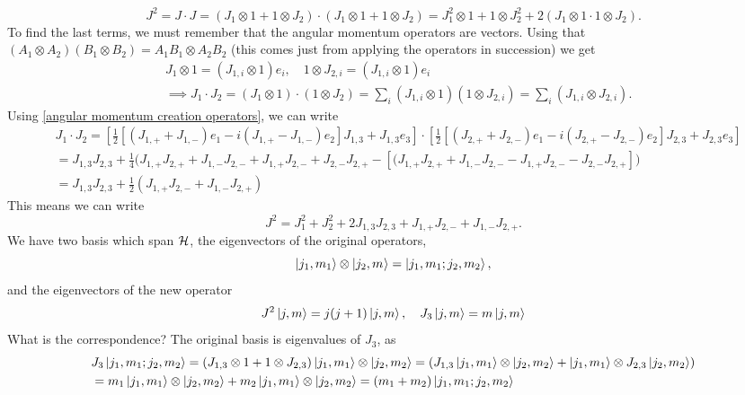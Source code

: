 \begin{equation*}
    J^2 = J \cdot J = (J_1 \otimes 1 + 1 \otimes J_2) \cdot (J_1 \otimes 1 + 1 \otimes J_2) = J_1^2 \otimes 1 + 1 \otimes J_2^2 + 2 (J_1 \otimes 1 \cdot 1 \otimes J_2).
\end{equation*}
To find the last terms, we must remember that the angular momentum operators are vectors. Using that $(A_1\otimes A_2)(B_1\otimes B_2) = A_1B_1 \otimes A_2B_2$ (this comes just from applying the operators in succession) we get
\begin{align*}
    & J_1\otimes 1 = (J_{1, i} \otimes 1) e_i, \quad  1 \otimes J_{2, i} = (J_{1, i} \otimes 1) e_i \\
    & \implies J_1 \cdot J_2 = (J_1 \otimes 1) \cdot( 1\otimes J_2) =   \sum_i (J_{1, i} \otimes 1) (1\otimes J_{2, i} ) = \sum_i (J_{1, i} \otimes J_{2,i}) . 
\end{align*}
Using \eqref{angular momentum creation operators}, we can write
\begin{align*}
    &J_1 \cdot J_2 
    = \left[\frac{1}{2}[(J_{1, +} + J_{1, -})e_1 - i(J_{1, +} - J_{1, -})e_2] J_{1, 3} + J_{1, 3}e_3 \right] \cdot 
        \left[\frac{1}{2}[(J_{2, +} + J_{2, -})e_1 - i(J_{2, +} - J_{2, -})e_2] J_{2, 3} + J_{2, 3}e_3 \right] \\
    &= J_{1,3}J_{2, 3} + \frac{1}{4} \bigg(J_{1, +}J_{2, +} + J_{1, -}J_{2, -} +  J_{1, +}J_{2, -} + J_{2, -}J_{2, +} 
        - [(J_{1, +}J_{2, +} + J_{1, -}J_{2, -} - J_{1, +}J_{2, -} - J_{2, -}J_{2, +}]  \bigg) \\
    &= J_{1,3}J_{2, 3} + \frac{1}{2}(J_{1, +}J_{2, -} + J_{1, -}J_{2, +})
\end{align*}
This means we can write
\begin{equation*}
    J^2 = J_1^2 + J_2^2 + 2J_{1, 3}J_{2, 3} + J_{1, +}J_{2, -} + J_{1, -}J_{2, +}.
\end{equation*}
We have two basis which span $\mathcal H$, the eigenvectors of the original operators, 
\begin{equation*}
    \ket{j_1, m_{1}} \otimes \ket{j_2, m_{}} = \ket{j_1, m_{1}; j_2, m_{2}},
\end{equation*}
and the eigenvectors of the new operator
\begin{equation*}
    J^2\ket{j, m} = j(j+1)\ket{j, m}, \quad J_3\ket{j, m} = m\ket{j, m}
\end{equation*}
What is the correspondence? The original basis is eigenvalues of $J_3$, as
\begin{align*}
    &J_3 \ket{j_1, m_{1}; j_2, m_{2}} = (J_{1, 3} \otimes 1+ 1 \otimes J_{2, 3})\ket{j_1, m_{1}} \otimes \ket{j_2, m_{2}} 
    = (J_{1, 3}\ket{j_1, m_{1}} \otimes \ket{j_2, m_{2}} + \ket{j_1, m_{1}} \otimes J_{2, 3}\ket{j_2, m_{2}}) \\
        &= m_1\ket{j_1, m_{1}} \otimes \ket{j_2, m_{2}} + m_2\ket{j_1, m_{1}} \otimes \ket{j_2, m_{2}} = (m_1 + m_2)\ket{j_1, m_{1}; j_2, m_{2}} 
\end{align*}
